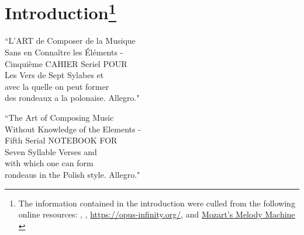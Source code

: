 \documentclass[a4paper,x11names,svgnames,10pt]{article}
\begin{document}
{\section[Introduction]{Introduction\footnote{The information contained in the introduction were culled from the following online resources:
	\citet{ac1802}, 
	\citet{wiki_mw2017},
	\url{https://opus-infinity.org/}, and 
	\href{https://www.sciencenews.org/article/mozarts-melody-machine-0}{Mozart's Melody Machine} \citep*{peterson2001}
	}
}
	\begin{center}
	\begin{minipage}{0.4\textwidth}
	\begin{flushleft}
		\begin{center}
			``\small L'ART de Composer de la Musique \\
			Sans en Connaître les \'{E}léments - \\
			Cinquième CAHIER Seriel POUR \\ 
			Les Vers de Sept Sylabes et \\
			avec la quelle on peut former \\
			des rondeaux a la polonaise.
			Allegro."
		\end{center}
	\end{flushleft}
	\end{minipage}
	\begin{minipage}{0.4\textwidth}
	\begin{flushright}
		\begin{center}
		``\small The Art of Composing Music \\
		Without Knowledge of the Elements - \\ 
		Fifth Serial NOTEBOOK FOR \\ 
		Seven Syllable Verses and \\ 
		with which one can form \\ 
		rondeaus in the Polish style.
		Allegro."
	\end{center}
	\end{flushright}
	\end{minipage}
	\end{center}

}
\end{document}
